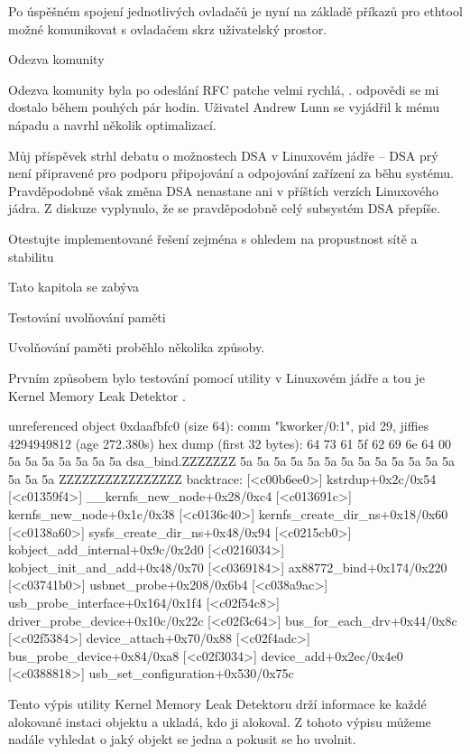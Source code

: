 Po úspěšném spojení jednotlivých ovladačů je nyní na základě příkazů pro ethtool možné komunikovat s ovladačem skrz uživatelský prostor.

\sec Odezva komunity

Odezva komunity byla po odeslání RFC patche velmi rychlá,
.
odpovědi se mi dostalo během pouhých pár hodin.
Uživatel Andrew Lunn se vyjádřil k mému nápadu a navrhl několik optimalizací.

Můj příspěvek strhl debatu o možnostech DSA v Linuxovém jádře -- DSA prý není připravené pro podporu připojování a odpojování zařízení za běhu systému.
Pravděpodobně však změna DSA nenastane ani v příštích verzích Linuxového jádra.
Z diskuze vyplynulo, že se pravděpodobně celý subsystém DSA přepíše.

\chap Otestujte implementované řešení zejména s ohledem na propustnost sítě a stabilitu

Tato kapitola se zabýva

\sec Testování uvolňování paměti

Uvolňování paměti proběhlo několika způsoby.

Prvním způsobem bylo testování pomocí utility v Linuxovém jádře a tou je Kernel Memory Leak Detektor
.

\begtt
unreferenced object 0xdaafbfc0 (size 64):
  comm "kworker/0:1", pid 29, jiffies 4294949812 (age 272.380s)
  hex dump (first 32 bytes):
    64 73 61 5f 62 69 6e 64 00 5a 5a 5a 5a 5a 5a 5a  dsa_bind.ZZZZZZZ
    5a 5a 5a 5a 5a 5a 5a 5a 5a 5a 5a 5a 5a 5a 5a 5a  ZZZZZZZZZZZZZZZZ
  backtrace:
    [<c00b6ee0>] kstrdup+0x2c/0x54
    [<c01359f4>] __kernfs_new_node+0x28/0xc4
    [<c013691c>] kernfs_new_node+0x1c/0x38
    [<c0136c40>] kernfs_create_dir_ns+0x18/0x60
    [<c0138a60>] sysfs_create_dir_ns+0x48/0x94
    [<c0215cb0>] kobject_add_internal+0x9c/0x2d0
    [<c0216034>] kobject_init_and_add+0x48/0x70
    [<c0369184>] ax88772_bind+0x174/0x220
    [<c03741b0>] usbnet_probe+0x208/0x6b4
    [<c038a9ac>] usb_probe_interface+0x164/0x1f4
    [<c02f54c8>] driver_probe_device+0x10c/0x22c
    [<c02f3c64>] bus_for_each_drv+0x44/0x8c
    [<c02f5384>] device_attach+0x70/0x88
    [<c02f4adc>] bus_probe_device+0x84/0xa8
    [<c02f3034>] device_add+0x2ec/0x4e0
    [<c0388818>] usb_set_configuration+0x530/0x75c
\endtt

Tento výpis utility Kernel Memory Leak Detektoru drží informace ke každé alokované instaci objektu a ukladá, kdo ji alokoval.
Z tohoto výpisu můžeme nadále vyhledat o jaký objekt se jedna a pokusit se ho uvolnit.


